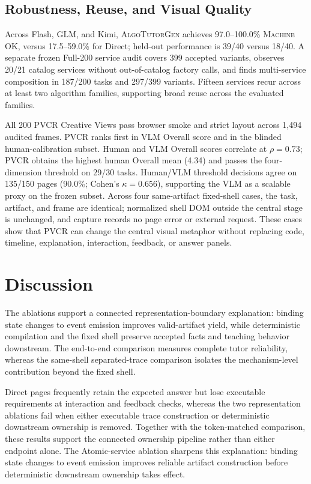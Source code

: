 \documentclass[letterpaper]{article}
\newcommand{\system}{\textsc{AlgoTutorGen}}
\newcommand{\machineok}{\textsc{Machine OK}}
\newcommand{\pvcr}{\textsc{PVCR}}
\begin{document}
\subsection{Robustness, Reuse, and Visual Quality}
Across Flash, GLM, and Kimi, \system{} achieves 97.0--100.0\%
\machineok{}, versus 17.5--59.0\% for Direct; held-out performance is
39/40 versus 18/40.
A separate frozen Full-200 service audit covers 399 accepted variants,
observes 20/21 catalog services without out-of-catalog factory calls,
and finds multi-service composition in 187/200 tasks and 297/399
variants. Fifteen services recur across at least two algorithm families,
supporting broad reuse across the evaluated families.

All 200 \pvcr{} Creative Views pass browser smoke and strict layout
across 1,494 audited frames.
\pvcr{} ranks first in VLM Overall score and in the blinded
human-calibration subset.
Human and VLM Overall scores correlate at \(\rho=0.73\); \pvcr{} obtains
the highest human Overall mean (4.34) and passes the four-dimension
threshold on 29/30 tasks. Human/VLM threshold decisions agree on 135/150
pages (90.0\%; Cohen's \(\kappa=0.656\)), supporting the VLM as a
scalable proxy on the frozen subset. Across four same-artifact
fixed-shell cases, the task, artifact, and frame are identical;
normalized shell DOM outside the central stage is unchanged, and capture
records no page error or external request. These cases show that \pvcr{}
can change the central visual metaphor without replacing code, timeline,
explanation, interaction, feedback, or answer panels.

\FloatBarrier

\section{Discussion}
\label{sec:discussion}

The ablations support a connected representation-boundary explanation:
binding state changes to event emission improves valid-artifact yield,
while deterministic compilation and the fixed shell preserve accepted
facts and teaching behavior downstream. The end-to-end comparison measures
complete tutor reliability, whereas the same-shell separated-trace
comparison isolates the mechanism-level contribution beyond the fixed
shell.

Direct pages frequently retain the expected answer but lose executable
requirements at interaction and feedback checks, whereas the two
representation ablations fail when either executable trace construction
or deterministic downstream ownership is removed. Together with the
token-matched comparison, these results support the connected ownership
pipeline rather than either endpoint alone.
The Atomic-service ablation sharpens this explanation: binding state
changes to event emission improves reliable artifact construction before
deterministic downstream ownership takes effect.
\end{document}
